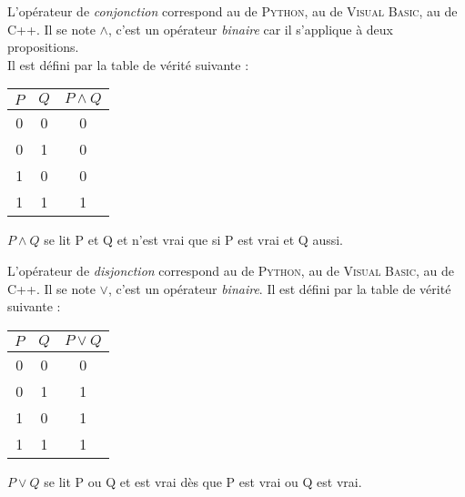 \documentclass[a4paper,12pt,french]{book}
\begin{document}
	\begin{definition}
	L'opérateur de \textit{conjonction} correspond au  de \textsc{Python}, au  de \textsc{Visual Basic}, au \tw{\&\&} de \textsc{C++}.
	Il se note $\wedge$, c'est un opérateur \textit{binaire} car il s'applique à deux propositions.\\
	Il est défini par la table de vérité suivante :
	\begin{center}
		\begin{tabular}{|c|c|c|}
			\hline
			\rowcolor{lightgray}
			$P$ & $Q$ & $P\wedge Q$\\
			\hline
			\rowcolor{white}
			0 & 0 & 0\\
			\hline
			\rowcolor{white}
			0 & 1 & 0\\
			\hline
			\rowcolor{white}
			1 & 0 & 0\\
			\hline\rowcolor{white}
			1 & 1 & 1\\
			\hline
		\end{tabular}
	\end{center}
	$P\wedge Q$ se lit \og P et Q\fg{} et n'est vrai que si P est vrai et Q aussi.
	\end{definition}

	\begin{definition}
	L'opérateur de \textit{disjonction} correspond au  de \textsc{Python}, au  de \textsc{Visual Basic}, au \tw{||} de \textsc{C++}.
	Il se note $\vee$, c'est un opérateur \textit{binaire}.	Il est défini par la table de vérité suivante :
	\begin{center}
		\begin{tabular}{|c|c|c|}
			\hline
			\rowcolor{lightgray}
			$P$ & $Q$ & $P\vee Q$\\
			\hline
			\rowcolor{white}
			0 & 0 & 0\\
			\hline
			\rowcolor{white}
			0 & 1 & 1\\
			\hline
			\rowcolor{white}
			1 & 0 & 1\\
			\hline\rowcolor{white}
			1 & 1 & 1\\
			\hline
		\end{tabular}
	\end{center}
	$P\vee Q$ se lit \og P ou Q\fg{} et est vrai dès que P est vrai ou Q est vrai.
\end{definition}
\end{document}
